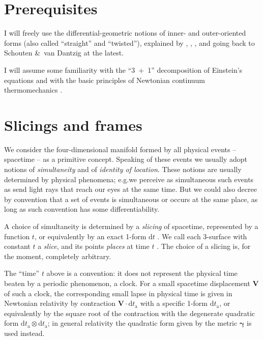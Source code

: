 \documentclass[\ifafour a4paper,12pt,\else a5paper,10pt,\fi%
onecolumn,oneside,article,%
british%
]{memoir}
\theoremstyle{remark}
\theoremstyle{innote}
\newcommand*{\citep}{\parencites}
\newcommand*{\citey}{\parencites*}
\renewcommand*{\cites}{\parencites}
\newcommand*{\amp}{\&}
\newcommand*{\di}{\mathrm{d}}%
\renewcommand*{\|}{\nonscript\,\vert\nonscript\;\mathopen{}}
\newcommand*{\sect}{\S}%
\newcommand*{\chap}{ch.}%
\newcommand*{\chaps}{chs}%
\newcommand*{\eg}{{e.g.}}
\newcommand*{\ytn}{t_{\textrm{a}}}
\newcommand*{\yffg}{\gamma}
\newcommand*{\yfg}{\bm{\yffg}}
\newcommand*{\ynn}{V}
\newcommand*{\yn}{\bm{\ynn}}
\begin{document}
\section{Prerequisites}
\label{sec:prereqs}

I will freely use the differential-geometric notions of inner- and
outer-oriented forms (also called \enquote{straight} and
\enquote{twisted}), explained by
\textcites{burke1995}[\chap~IV]{burke1985_r1987}{burke1983},
\textcites[\chaps~2, 3]{bossavit1991}{bossavit1998b},
\textcite[\chap~A]{hehletal2003}, and going back to Schouten \amp\ van
Dantzig \citey{schoutenetal1940} at the latest.

I will assume some familiarity with the \enquote{3~+~1} decomposition of
Einstein's equations \citep{smarretal1978,york1979,smarretal1980} and with
the basic principles of Newtonian continuum thermomechanics
\citep{truesdell1977_r1991,samohyletal1987_r2014,truesdelletal1960}.

\section{Slicings and frames}
\label{sec:slicing_frames}

We consider the four-dimensional manifold formed by all physical events --
spacetime -- as a primitive concept. Speaking of these events we usually
adopt notions of \emph{simultaneity} and of \emph{identity of location}.
These notions are usually determined by physical phenomena; \eg we perceive
as simultaneous such events as send light rays that reach our eyes at the
same time. But we could also decree by convention that a set of events is
simultaneous or occurs at the same place, as long as such convention has
some differentiability.

A choice of simultaneity is determined by a \emph{slicing} of spacetime,
represented by a function $t$, or equivalently by an exact 1-form $\di t$
\citep{york1979}. We call each 3-surface with constant $t$ a \emph{slice},
and its points \emph{places} at time $t$ \cites{smarretal1978,york1979,smarretal1980}[\sect~2.4]{marsdenetal1994}. The choice of a slicing is, for
the moment, completely arbitrary.

The \enquote{time} $t$ above is a convention: it does not represent the
physical time beaten by a periodic phenomenon, a clock. For a small
spacetime displacement $\yn$ of such a clock, the corresponding small lapse
in physical time is given in Newtonian relativity by contraction
$\yn\cdot\di\ytn$ with a specific 1-form $\di\ytn$, or equivalently by the
square root of the contraction with the degenerate quadratic form
$\di\ytn \otimes \di\ytn$; in general relativity the quadratic form given
by the metric $\yfg$ is used instead.
\end{document}
